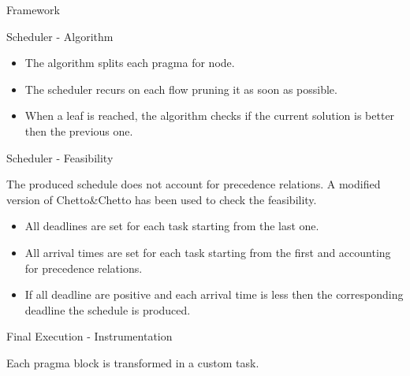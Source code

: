 \documentclass[xcolor=dvipsnames]{beamer}
\begin{document}
\begin{section}{Framework}
\begin{frame}{\hskip 0.3cm Scheduler - Algorithm}
\begin{itemize}
\item The algorithm splits each pragma for node.

\item The scheduler recurs on each flow pruning it as soon as possible.

\item When a leaf is reached, the algorithm checks if the current solution is better then the previous one.

\end{itemize}

\end{frame}












\begin{frame}{\hskip 0.3cm Scheduler - Feasibility}

The produced schedule does not account for precedence relations. A modified version of Chetto\&Chetto has been used to check the feasibility.

\begin{itemize}

\item All deadlines are set for each task starting from the last one.

\item All arrival times are set for each task starting from the first and accounting for precedence relations.

\item If all deadline are positive and each arrival time is less then the corresponding deadline the schedule is produced.

\end{itemize}



\end{frame}













\begin{frame}{\hskip 0.3cm Final Execution - Instrumentation}

Each pragma block is transformed in a custom task.


\begin{itemize}


\end{itemize}
\end{frame}
\end{section}
\end{document}
